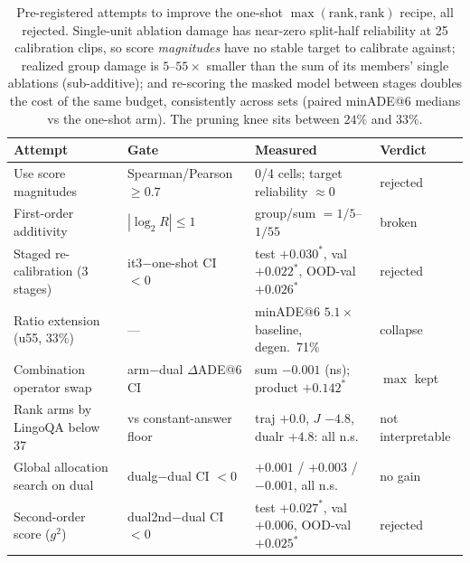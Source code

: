 \begin{table}[t]
\centering
\small
\setlength{\tabcolsep}{5pt}
\caption{%
  Pre-registered attempts to improve the one-shot $\max(\mathrm{rank},\mathrm{rank})$
  recipe, all rejected. Single-unit ablation damage has near-zero split-half
  reliability at 25 calibration clips, so score \emph{magnitudes} have no stable
  target to calibrate against; realized group damage is $5$--$55\times$ smaller than
  the sum of its members' single ablations (sub-additive); and re-scoring the masked
  model between stages doubles the cost of the same budget, consistently across sets
  (paired minADE@6 medians vs the one-shot arm). The pruning knee sits between
  $24\%$ and $33\%$.
}
\label{tab:negatives}
\begin{tabular}{llll}
\toprule
Attempt & Gate & Measured & Verdict \\
\midrule
Use score magnitudes  & Spearman/Pearson $\geq 0.7$ & 0/4 cells; target reliability $\approx 0$ & rejected \\
First-order additivity & $|\log_2 R| \leq 1$ & group/sum $= 1/5$--$1/55$ & broken \\
Staged re-calibration (3 stages) & it3$-$one-shot CI $< 0$ & test $+0.030^*$, val $+0.022^*$, OOD-val $+0.026^*$ & rejected \\
Ratio extension (u55, 33\%) & --- & minADE@6 $5.1\times$ baseline, degen.\ 71\% & collapse \\
Combination operator swap & arm$-$dual $\Delta$ADE@6 CI & sum $-0.001$ (ns); product $+0.142^*$ & $\max$ kept \\
Rank arms by LingoQA below 37 & vs constant-answer floor & traj $+0.0$, $J$ $-4.8$, dualr $+4.8$: all n.s. & not interpretable \\
Global allocation search on dual & dualg$-$dual CI $< 0$ & $+0.001$ / $+0.003$ / $-0.001$, all n.s. & no gain \\
Second-order score ($g^2$) & dual2nd$-$dual CI $< 0$ & test $+0.027^*$, val $+0.006$, OOD-val $+0.025^*$ & rejected \\
\bottomrule
\end{tabular}
\end{table}

